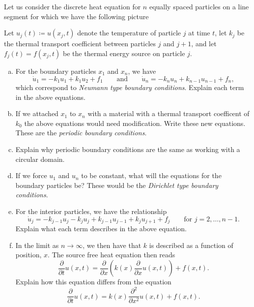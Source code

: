 \documentclass[12pt]{article} %
\begin{document}
\begin{problem}
Let us consider the discrete heat equation for $n$ equally spaced particles on a line segment for which we have the following picture
\begin{figure}[H]
	\centering
	\resizebox{.9\columnwidth}{!}{}
\end{figure}
Let $u_j(t) \coloneqq u(x_j,t)$ denote the temperature of particle $j$ at time $t$, let $k_j$ be the thermal transport coefficient between particles $j$ and $j+1$, and let $f_j(t)=f(x_j,t)$ be the thermal energy source on particle $j$.
\begin{enumerate}[(a)]
    \item For the boundary particles $x_1$ and $x_n$, we have
    \[
    \dot{u}_1 = -k_1 u_1 + k_1 u_{2} + f_1 \qquad \textrm{and} \qquad \dot{u}_n = -k_n u_{n} + k_{n-1} u_{n-1} +f_n,
    \]
    which correspond to \emph{Neumann type boundary conditions}. Explain each term in the above equations.
    \item If we attached $x_1$ to $x_n$ with a material with a thermal transport coefficent of $k_0$ the above equations would need modification. Write these new equations. These are the \emph{periodic boundary conditions}. 
    \item Explain why periodic boundary conditions are the same as working with a circular domain.
    \item If we force $u_1$ and $u_n$ to be constant, what will the equations for the boundary particles be? These would be the \emph{Dirichlet type boundary conditions}.
    \item For the interior particles, we have the relationship
    \[
    \dot{u}_j = -k_{j-1}u_j - k_{j} u_j + k_{j-1}u_{j-1} + k_{j} u_{j+1} +f_j \qquad \textrm{for $j=2,\dots,n-1$}.
    \]
    Explain what each term describes in the above equation.
    \item In the limit as $n\to \infty$, we then have that $k$ is described as a function of position, $x$. The source free heat equation then reads
    \[
    \frac{\partial}{\partial t}u(x,t) = \frac{\partial}{\partial x} \left( k(x)\frac{\partial}{\partial x} u(x,t) \right) + f(x,t).
    \]
    Explain how this equation differs from the equation
    \[
    \frac{\partial}{\partial t}u(x,t) = k(x) \frac{\partial^2}{\partial x^2} u(x,t)+f(x,t).
    \]
\end{enumerate}
\end{problem}
\end{document}
